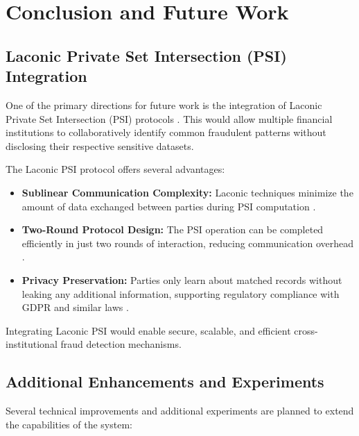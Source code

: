 \chapter{Conclusion and Future Work}

\section{Laconic Private Set Intersection (PSI) Integration}

One of the primary directions for future work is the integration of Laconic Private Set Intersection (PSI) protocols \cite{cryptoeprint:2023/404}.  
This would allow multiple financial institutions to collaboratively identify common fraudulent patterns without disclosing their respective sensitive datasets.

The Laconic PSI protocol offers several advantages:

\begin{itemize}
    \item \textbf{Sublinear Communication Complexity:} Laconic techniques minimize the amount of data exchanged between parties during PSI computation \cite{cryptoeprint:2023/404}.
    \item \textbf{Two-Round Protocol Design:} The PSI operation can be completed efficiently in just two rounds of interaction, reducing communication overhead \cite{cryptoeprint:2023/404}.
    \item \textbf{Privacy Preservation:} Parties only learn about matched records without leaking any additional information, supporting regulatory compliance with GDPR and similar laws \cite{cryptoeprint:2023/404}.
\end{itemize}

Integrating Laconic PSI would enable secure, scalable, and efficient cross-institutional fraud detection mechanisms.

\section{Additional Enhancements and Experiments}

Several technical improvements and additional experiments are planned to extend the capabilities of the system:

